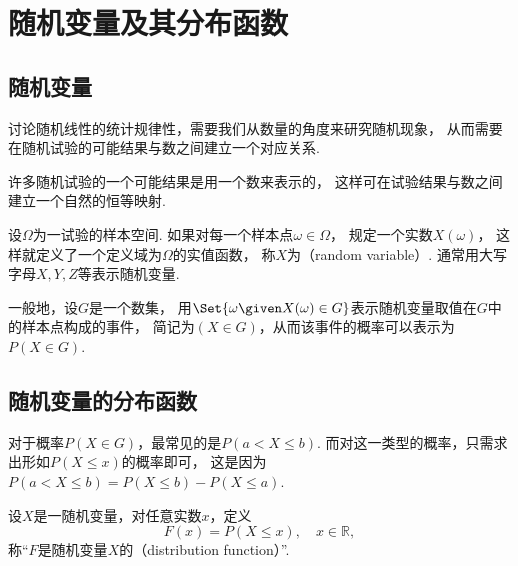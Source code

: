 \section{随机变量及其分布函数}
\subsection{随机变量}
讨论随机线性的统计规律性，需要我们从数量的角度来研究随机现象，
从而需要在随机试验的可能结果与数之间建立一个对应关系.

许多随机试验的一个可能结果是用一个数来表示的，
这样可在试验结果与数之间建立一个自然的恒等映射.

\begin{definition}
设\(\Omega\)为一试验的样本空间.
如果对每一个样本点\(\omega \in \Omega\)，
规定一个实数\(X(\omega)\)，
这样就定义了一个定义域为\(\Omega\)的实值函数，
称\(X\)为（random variable）.
通常用大写字母\(X,Y,Z\)等表示随机变量.

一般地，设\(G\)是一个数集，
用\(\Set{\omega \given X(\omega) \in G}\)表示随机变量取值在\(G\)中的样本点构成的事件，
简记为\((X \in G)\)，从而该事件的概率可以表示为\(P(X \in G)\).
\end{definition}

\subsection{随机变量的分布函数}
对于概率\(P(X \in G)\)，最常见的是\(P(a < X \leq b)\).
而对这一类型的概率，只需求出形如\(P(X \leq x)\)的概率即可，
这是因为\(P(a < X \leq b) = P(X \leq b) - P(X \leq a)\).

\begin{definition}
设\(X\)是一随机变量，对任意实数\(x\)，定义\begin{equation*}
	F(x) = P(X \leq x),
	\quad x \in \mathbb{R},
\end{equation*}
称“\(F\)是随机变量\(X\)的（distribution function）”.
\end{definition}

